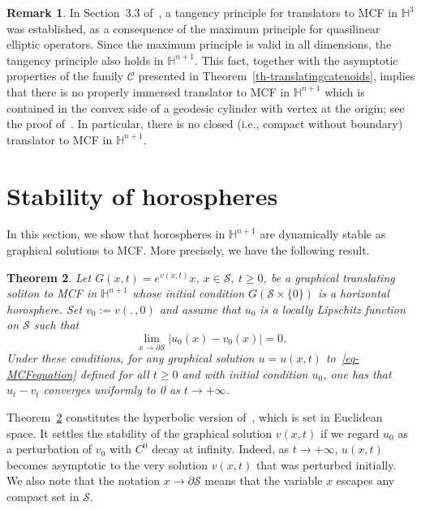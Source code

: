 \documentclass{amsart}[12pt]
\newcommand{\cS}{\mathcal{S}}
\newtheorem{theorem}{Theorem}[section]
\theoremstyle{definition}
\newtheorem{remark}[theorem]{Remark}
\theoremstyle{plain}
\newcommand{\h}{\mathbb{H} }
\begin{document}
\begin{remark}
In Section~3.3 of~\cite{dLRS}, a tangency principle for translators to MCF
in $\h^{3}$ was established, as a consequence of the maximum principle for quasilinear
elliptic operators. Since the maximum principle is valid in all dimensions,
the tangency principle also holds in $\mathbb{H}^{n+1}$.
This fact, together with the asymptotic properties
of the family $\mathscr C$ presented in Theorem~\ref{th-translatingcatenoids},
implies that
there is no properly immersed
translator to {\rm MCF} in $\h^{n+1}$ which is contained in
the convex side of a geodesic cylinder with vertex at the origin; see the proof
of~\cite[Theorem 3.25]{dLRS}.
In particular, there is no closed (i.e., compact without boundary)
translator to {\rm MCF} in $\h^{n+1}$.
\end{remark}


\section{Stability of horospheres}\label{sec-stability}
In this section, we show that horospheres in $\h^{n+1}$
are dynamically stable as graphical solutions to MCF. More precisely, we have the following result.

\begin{theorem} \label{thm-stability}
Let $G(x,t)=e^{v(x,t)}x$, $x\in\mathcal S,\ t\geq0$,
be a graphical translating soliton
to {\rm MCF} in $\h^{n+1}$ whose initial condition
$G(\mathcal S\times\{0\})$ is a horizontal horosphere.
Set $v_0:=v(.\,, 0)$ and assume that
$u_0$ is a locally Lipschitz function on $\mathcal S$ such that
\begin{equation} \label{eq-condition}
\lim_{x\to\partial\mathcal S}|u_0(x)-v_0(x)|=0.
\end{equation}
Under these conditions, for any graphical solution $u=u(x,t)$
to~\eqref{eq-MCFequation} defined for all $t\ge 0$ and
with initial condition $u_0$, one has
that $u_t-v_t$
converges uniformly to 0 as $t\to+\infty$.
\end{theorem}

Theorem~\ref{thm-stability} constitutes the hyperbolic version
of~\cite[Theorem 1.1]{schulze}, which is set in Euclidean space.
It settles the stability of the graphical solution
$v(x,t)$ if we regard $u_0$ as a perturbation of $v_0$
with $C^0$ decay at infinity.
Indeed, as $t\to+\infty$, $u(x,t)$  becomes asymptotic
to the very solution $v(x,t)$ that was perturbed initially.
We also note that the notation $x\to\partial \cS$ means that
the variable $x$ escapes any compact set in $\cS$.
\end{document}
